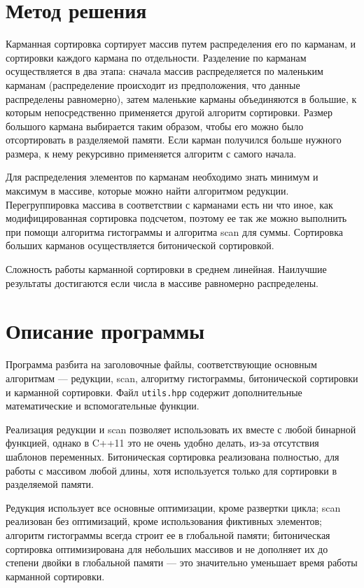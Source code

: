 \section{Метод решения}
Карманная сортировка сортирует массив путем распределения его по карманам, и сортировки каждого кармана по отдельности. Разделение по карманам осуществляется в два этапа: сначала массив распределяется по маленьким карманам (распределение происходит из предположения, что данные распределены равномерно), затем маленькие карманы объединяются в большие, к которым непосредственно применяется другой алгоритм сортировки. Размер большого кармана выбирается таким образом, чтобы его можно было отсортировать в разделяемой памяти. Если карман получился больше нужного размера, к нему рекурсивно применяется алгоритм с самого начала.

Для распределения элементов по карманам необходимо знать минимум и максимум в массиве, которые можно найти алгоритмом редукции. Перегруппировка массива в соответствии с карманами есть ни что иное, как модифицированная сортировка подсчетом, поэтому ее так же можно выполнить при помощи алгоритма гистограммы и алгоритма scan для суммы. Сортировка больших карманов осуществляется битонической сортировкой.

Сложность работы карманной сортировки в среднем линейная. Наилучшие результаты достигаются если числа в массиве равномерно распределены.

\section{Описание программы}
Программа разбита на заголовочные файлы, соответствующие основным алгоритмам --- редукции, scan, алгоритму гистограммы, битонической сортировки и карманной сортировки. Файл \texttt{utils.hpp} содержит дополнительные математические и вспомогательные функции.

Реализация редукции и scan позволяет использовать их вместе с любой бинарной функцией, однако в C++11 это не очень удобно делать, из-за отсутствия шаблонов переменных. Битоническая сортировка реализована полностью, для работы с массивом любой длины, хотя используется только для сортировки в разделяемой памяти.

Редукция использует все основные оптимизации, кроме развертки цикла; scan реализован без оптимизаций, кроме использования фиктивных элементов; алгоритм гистограммы всегда строит ее в глобальной памяти; битоническая сортировка оптимизирована для небольших массивов и не дополняет их до степени двойки в глобальной памяти --- это значительно уменьшает время работы карманной сортировки.
